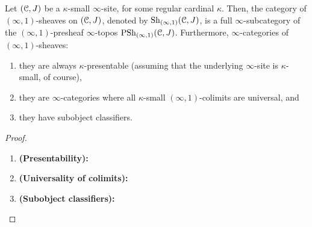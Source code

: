                 \begin{proposition} \label{prop: infinity_categories_of_higher_sheaves}
                    Let $(\mathcal{C}, J)$ be a $\kappa$-small $\infty$-site, for some regular cardinal $\kappa$. Then, the category of $(\infty, 1)$-sheaves on $(\mathcal{C}, J)$, denoted by $\mathrm{Sh}_{(\infty, 1)}(\mathcal{C}, J)$, is a full $\infty$-subcategory of the $(\infty, 1)$-presheaf $\infty$-topos $\mathrm{PSh}_{(\infty, 1)}(\mathcal{C}, J)$. Furthermore, $\infty$-categories of $(\infty, 1)$-sheaves:
                        \begin{enumerate}
                            \item they are always $\kappa$-presentable (assuming that the underlying $\infty$-site is $\kappa$-small, of course),
                            \item they are $\infty$-categories where all $\kappa$-small $(\infty, 1)$-colimits are universal, and
                            \item they have subobject classifiers.
                        \end{enumerate}
                \end{proposition}
                    \begin{proof}
                        \noindent
                        \begin{enumerate}
                            \item \textbf{(Presentability):} 
                            \item \textbf{(Universality of colimits):}
                            \item \textbf{(Subobject classifiers):}
                        \end{enumerate}
                    \end{proof}
